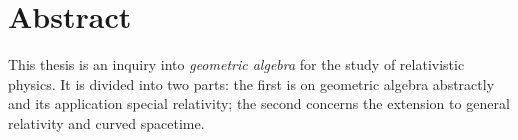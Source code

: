 \chapter*{Abstract}

This thesis is an inquiry into \emph{geometric algebra} for the study of relativistic physics.
It is divided into two parts: the first is on geometric algebra abstractly and its application special relativity; the second concerns the extension to general relativity and curved spacetime.

